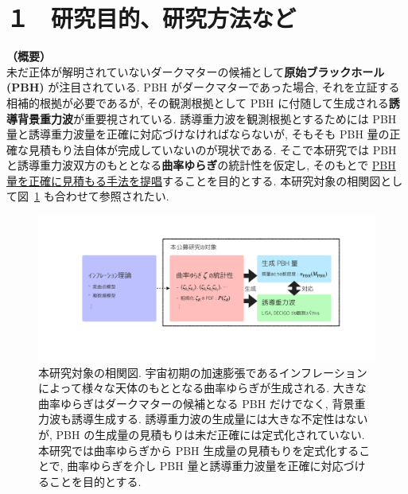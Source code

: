 \documentclass[11pt,a4paper,uplatex,dvipdfmx]{ujarticle} 		%
\newcommand{\研究課題名}{曲率ゆらぎの統計と原始ブラックホール量の精密対応}
\newcommand{\研究機関名}{名古屋大学}
\newcommand{\研究代表者氏名}{多田祐一郎}
\newcommand{\研究期間の最終元号年度}{4}  %
\renewcommand{\emph}[1]{{\sffamily\gtfamily\bfseries #1}}
\begin{document}
\mgfamily\sffamily


\section{１　研究目的、研究方法など}

\noindent
\textbf{（概要）}\\

\noindent	
未だ正体が解明されていないダークマターの候補として\emph{原始ブラックホール (PBH)} が注目されている.
PBH がダークマターであった場合, それを立証する相補的根拠が必要であるが,
その観測根拠として PBH に付随して生成される\emph{誘導背景重力波}が重要視されている.
誘導重力波を観測根拠とするためには PBH 量と誘導重力波量を正確に対応づけなければならないが,
そもそも PBH 量の正確な見積もり法自体が完成していないのが現状である.
そこで本研究では PBH と誘導重力波双方のもととなる\emph{曲率ゆらぎ}の統計性を仮定し,
そのもとで \ul{PBH 量を正確に見積もる手法を提唱}することを目的とする.
本研究対象の相関図として図~\ref{fig: abstract} も合わせて参照されたい.

\begin{figure}[h]
	\centering
	\includegraphics[width=\hsize]{figs/abstract.pdf}
	\caption{本研究対象の相関図. 宇宙初期の加速膨張であるインフレーションによって様々な天体のもととなる曲率ゆらぎが生成される. 大きな曲率ゆらぎはダークマターの候補となる PBH だけでなく,
	背景重力波も誘導生成する. 誘導重力波の生成量には大きな不定性はないが, PBH の生成量の見積もりは未だ正確には定式化されていない. 本研究では曲率ゆらぎから PBH 生成量の見積もりを定式化することで,
	曲率ゆらぎを介し PBH 量と誘導重力波量を正確に対応づけることを目的とする.}
	\label{fig: abstract}
\end{figure}
	
\end{document}
